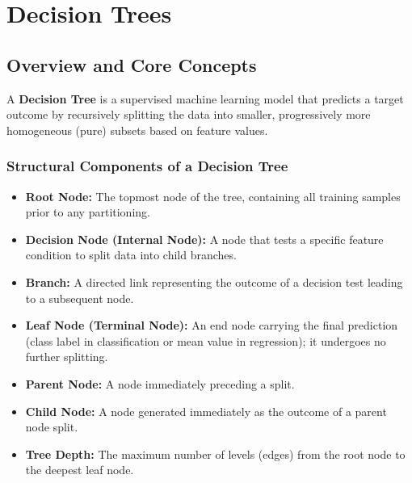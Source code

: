 \chapter{Decision Trees}

\section{Overview and Core Concepts}

A \textbf{Decision Tree} is a supervised machine learning model that predicts a target outcome by recursively splitting the data into smaller, progressively more homogeneous (pure) subsets based on feature values.

\subsection{Structural Components of a Decision Tree}
\begin{itemize}
    \item \textbf{Root Node:} The topmost node of the tree, containing all training samples prior to any partitioning.
    \item \textbf{Decision Node (Internal Node):} A node that tests a specific feature condition to split data into child branches.
    \item \textbf{Branch:} A directed link representing the outcome of a decision test leading to a subsequent node.
    \item \textbf{Leaf Node (Terminal Node):} An end node carrying the final prediction (class label in classification or mean value in regression); it undergoes no further splitting.
    \item \textbf{Parent Node:} A node immediately preceding a split.
    \item \textbf{Child Node:} A node generated immediately as the outcome of a parent node split.
    \item \textbf{Tree Depth:} The maximum number of levels (edges) from the root node to the deepest leaf node.
\end{itemize}

